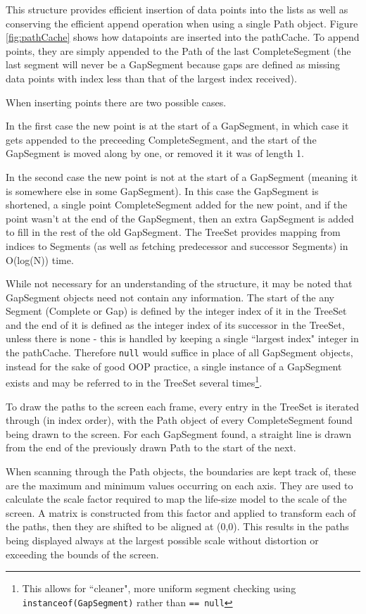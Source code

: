 This structure provides efficient insertion of data points into the lists as well as conserving the efficient append operation when using a single Path object. Figure \ref{fig:pathCache} shows how datapoints are inserted into the pathCache. To append points, they are simply appended to the Path of the last CompleteSegment (the last segment will never be a GapSegment because gaps are defined as missing data points with index less than that of the largest index received).

When inserting points there are two possible cases.

In the first case the new point is at the start of a GapSegment, in which case it gets appended to the preceeding CompleteSegment, and the start of the GapSegment is moved along by one, or removed it it was of length 1.

In the second case the new point is not at the start of a GapSegment (meaning it is somewhere else in some GapSegment). In this case the GapSegment is shortened, a single point CompleteSegment added for the new point, and if the point wasn't at the end of the GapSegment, then an extra GapSegment is added to fill in the rest of the old GapSegment. The TreeSet provides mapping from indices to Segments (as well as fetching predecessor and successor Segments) in O(log(N)) time.

While not necessary for an understanding of the structure, it may be noted that GapSegment objects need not contain any information. The start of the any Segment (Complete or Gap) is defined by the integer index of it in the TreeSet and the end of it is defined as the integer index of its successor in the TreeSet, unless there is none - this is handled by keeping a single ``largest index" integer in the pathCache. Therefore {\tt null} would suffice in place of all GapSegment objects, instead for the sake of good OOP practice, a single instance of a GapSegment exists and may be referred to in the TreeSet several times\footnote{This allows for ``cleaner", more uniform segment checking using {\tt instanceof(GapSegment)} rather than {\tt == null}}.

To draw the paths to the screen each frame, every entry in the TreeSet is iterated through (in index order), with the Path object of every CompleteSegment found being drawn to the screen. For each GapSegment found, a straight line is drawn from the end of the previously drawn Path to the start of the next.

When scanning through the Path objects, the boundaries are kept track of, these are the maximum and minimum values occurring on each axis. They are used to calculate the scale factor required to map the life-size model to the scale of the screen. A matrix is constructed from this factor and applied to transform each of the paths, then they are shifted to be aligned at (0,0). This results in the paths being displayed always at the largest possible scale without distortion or exceeding the bounds of the screen.

